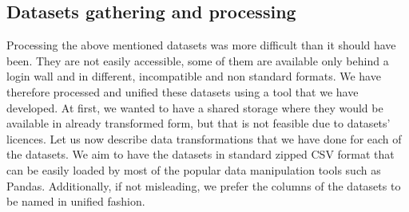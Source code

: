 \subsection{Datasets gathering and processing} \label{subsec:04_single_user_datasets.gathering_processing}

Processing the above mentioned datasets was more difficult than it should have been. They are not easily accessible, some of them are available only behind a login wall and in different, incompatible and non standard formats. We have therefore processed and unified these datasets using a tool that we have developed. At first, we wanted to have a shared storage where they would be available in already transformed form, but that is not feasible due to datasets' licences. Let us now describe data transformations that we have done for each of the datasets. We aim to have the datasets in standard zipped CSV format that can be easily loaded by most of the popular data manipulation tools such as Pandas. Additionally, if not misleading, we prefer the columns of the datasets to be named in unified fashion.

